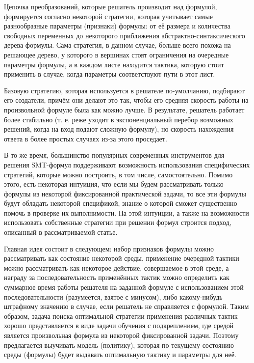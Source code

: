 Цепочка преобразований, которые решатель производит над формулой, формируется согласно некоторой стратегии, которая учитывает самые разнообразные параметры (признаки) формулы: от её размера и количества свободных переменных до некоторого приближения абстрактно-синтаксического дерева формулы. Сама стратегия, в данном случае, больше всего похожа на решающее дерево, у которого в вершинах стоят ограничения на очередные параметры формулы, а в каждом листе находится тактика, которую стоит применить в случае, когда параметры соответствуют пути в этот лист.

Базовую стратегию, которая используется в решателе по-умолчанию, подбирают его создатели, причём они делают это так, чтобы его средняя скорость работы на произвольной формуле была как можно лучше. В результате, решатель работает более стабильно (т. е. реже уходит в экспоненциальный перебор возможных решений, когда на вход подают сложную формулу), но скорость нахождения ответа в более простых случаях из-за этого проседает.

В то же время, большинство популярных современных инструментов для решения SMT-формул поддерживают возможность использования специфических стратегий, которые можно построить, в том числе, самостоятельно. Помимо этого, есть некоторая интуиция, что если мы будем рассматривать только формулы из некоторой фиксированной практической задачи, то все эти формулы будут обладать некоторой спецификой, знание о которой сможет существенно помочь в проверке их выполнимости. На этой интуиции, а также на возможности использовать собственные стратегии при решении формул строится подход, описанный в рассматриваемой статье.

Главная идея состоит в следующем: набор признаков формулы можно рассматривать как состояние некоторой среды, применение очередной тактики можно рассматривать как некоторое действие, совершаемое в этой среде, а награду за последовательность применённых тактик можно определить как суммарное время работы решателя на заданной формуле с использованием этой последовательности (разумеется, взятое с минусом), либо какому-нибудь штрафному значению в случае, если решатель не справляется с формулой. Таким образом, задача поиска оптимальной стратегии применения различных тактик хорошо представляется в виде задачи обучения с подкреплением, где средой является произвольная формула из некоторой фиксированной задачи. Поэтому предлагается выучивать модель (политику), которая по текущему состоянию среды (формулы) будет выдавать оптимальную тактику и параметры для неё.

